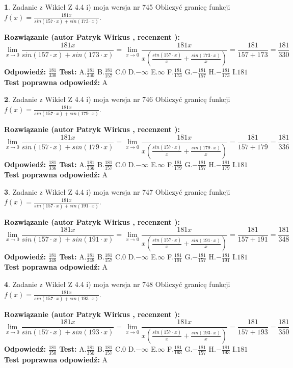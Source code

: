 \documentclass[12pt, a4paper]{article}
\theoremstyle{definition} %
\newtheorem{zad}{}
\newcommand{\zadStart}[1]{\begin{zad}#1\newline}
\newcommand{\zadStop}{\end{zad}}
\newcommand{\rozwStart}[2]{\noindent \textbf{Rozwiązanie (autor #1 , recenzent #2): }\newline}
\newcommand{\rozwStop}{\newline}
\newcommand{\odpStart}{\noindent \textbf{Odpowiedź:}\newline}
\newcommand{\odpStop}{\newline}
\newcommand{\testStart}{\noindent \textbf{Test:}\newline}
\newcommand{\testStop}{\newline}
\newcommand{\kluczStart}{\noindent \textbf{Test poprawna odpowiedź:}\newline}
\newcommand{\kluczStop}{\newline}
\begin{document}
\zadStart{Zadanie z Wikieł Z 4.4 i) moja wersja nr 745}
Obliczyć granicę funkcji $f(x)=\frac{181x}{sin(157\cdot x) +sin(173\cdot x)}$.
\zadStop
\rozwStart{Patryk Wirkus}{}
$$\lim\limits_{x\to 0}\frac{181x}{sin(157\cdot x) +sin(173\cdot x)}=\lim\limits_{x\to 0}\frac{181x}{x(\frac{sin(157\cdot x)}{x}+\frac{sin(173\cdot x)}{x})}=\frac{181}{157+173} = \frac{181}{330}$$
\rozwStop
\odpStart
$\frac{181}{330}$
\odpStop
\testStart
A.$\frac{181}{330}$
B.$\frac{181}{157}$
C.$0$
D.$-\infty$
E.$\infty$
F.$\frac{181}{173}$
G.$-\frac{181}{157}$
H.$-\frac{181}{173}$
I.$181$
\testStop
\kluczStart
A
\kluczStop



\zadStart{Zadanie z Wikieł Z 4.4 i) moja wersja nr 746}
Obliczyć granicę funkcji $f(x)=\frac{181x}{sin(157\cdot x) +sin(179\cdot x)}$.
\zadStop
\rozwStart{Patryk Wirkus}{}
$$\lim\limits_{x\to 0}\frac{181x}{sin(157\cdot x) +sin(179\cdot x)}=\lim\limits_{x\to 0}\frac{181x}{x(\frac{sin(157\cdot x)}{x}+\frac{sin(179\cdot x)}{x})}=\frac{181}{157+179} = \frac{181}{336}$$
\rozwStop
\odpStart
$\frac{181}{336}$
\odpStop
\testStart
A.$\frac{181}{336}$
B.$\frac{181}{157}$
C.$0$
D.$-\infty$
E.$\infty$
F.$\frac{181}{179}$
G.$-\frac{181}{157}$
H.$-\frac{181}{179}$
I.$181$
\testStop
\kluczStart
A
\kluczStop



\zadStart{Zadanie z Wikieł Z 4.4 i) moja wersja nr 747}
Obliczyć granicę funkcji $f(x)=\frac{181x}{sin(157\cdot x) +sin(191\cdot x)}$.
\zadStop
\rozwStart{Patryk Wirkus}{}
$$\lim\limits_{x\to 0}\frac{181x}{sin(157\cdot x) +sin(191\cdot x)}=\lim\limits_{x\to 0}\frac{181x}{x(\frac{sin(157\cdot x)}{x}+\frac{sin(191\cdot x)}{x})}=\frac{181}{157+191} = \frac{181}{348}$$
\rozwStop
\odpStart
$\frac{181}{348}$
\odpStop
\testStart
A.$\frac{181}{348}$
B.$\frac{181}{157}$
C.$0$
D.$-\infty$
E.$\infty$
F.$\frac{181}{191}$
G.$-\frac{181}{157}$
H.$-\frac{181}{191}$
I.$181$
\testStop
\kluczStart
A
\kluczStop



\zadStart{Zadanie z Wikieł Z 4.4 i) moja wersja nr 748}
Obliczyć granicę funkcji $f(x)=\frac{181x}{sin(157\cdot x) +sin(193\cdot x)}$.
\zadStop
\rozwStart{Patryk Wirkus}{}
$$\lim\limits_{x\to 0}\frac{181x}{sin(157\cdot x) +sin(193\cdot x)}=\lim\limits_{x\to 0}\frac{181x}{x(\frac{sin(157\cdot x)}{x}+\frac{sin(193\cdot x)}{x})}=\frac{181}{157+193} = \frac{181}{350}$$
\rozwStop
\odpStart
$\frac{181}{350}$
\odpStop
\testStart
A.$\frac{181}{350}$
B.$\frac{181}{157}$
C.$0$
D.$-\infty$
E.$\infty$
F.$\frac{181}{193}$
G.$-\frac{181}{157}$
H.$-\frac{181}{193}$
I.$181$
\testStop
\kluczStart
A
\kluczStop
\end{document}
